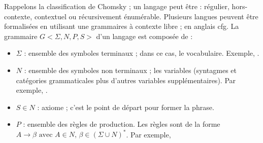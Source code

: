 \documentclass{KodeBook}
\begin{document}
Rappelons la classification de Chomsky ; un langage peut être : régulier, hors-contexte, contextuel ou récursivement énumérable. 
Plusieurs langues peuvent être formalisées en utilisant une grammaires à contexte libre ; en anglais \acl{cfg}.
La grammaire $G <\Sigma, N, P, S>$ d'un langage est composée de :
\begin{itemize}
	\item $\Sigma$ : ensemble des symboles terminaux ; dans ce cas, le vocabulaire. 
	Exemple, . 
	
	\item $N$ : ensemble des symboles non terminaux ; les variables (syntagmes et catégories grammaticales plus d'autres variables supplémentaires). 
	Par exemple, .
	
	\item $S \in N$ : axiome ; c'est le point de départ pour former la phrase. 
	
	\item $P$ : ensemble des règles de production.
	Les règles sont de la forme $A \rightarrow \beta \text{ avec } A \in N,\, \beta \in (\Sigma \cup N)^*$.
	Par exemple, 
\end{itemize}
\end{document}
